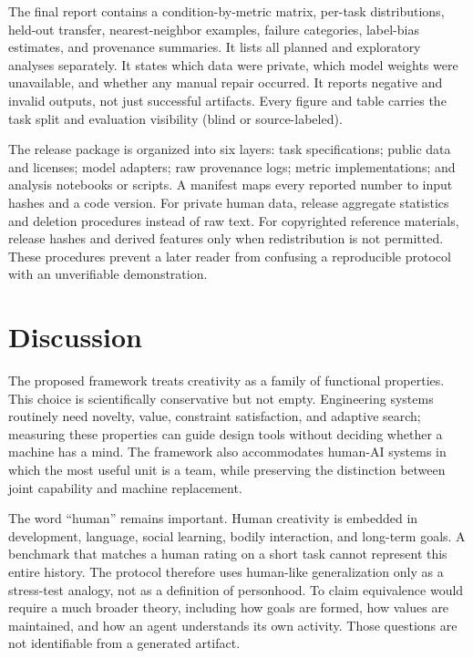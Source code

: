 \documentclass[conference]{IEEEtran}
\begin{document}
The final report contains a condition-by-metric matrix, per-task distributions, held-out
transfer, nearest-neighbor examples, failure categories, label-bias estimates, and
provenance summaries. It lists all planned and exploratory analyses separately. It
states which data were private, which model weights were unavailable, and whether any
manual repair occurred. It reports negative and invalid outputs, not just successful
artifacts. Every figure and table carries the task split and evaluation visibility
(blind or source-labeled).

The release package is organized into six layers: task specifications; public data and
licenses; model adapters; raw provenance logs; metric implementations; and analysis
notebooks or scripts. A manifest maps every reported number to input hashes and a code
version. For private human data, release aggregate statistics and deletion procedures
instead of raw text. For copyrighted reference materials, release hashes and derived
features only when redistribution is not permitted. These procedures prevent a later
reader from confusing a reproducible protocol with an unverifiable demonstration.

\section{Discussion}
\label{sec:discussion}

The proposed framework treats creativity as a family of functional properties. This
choice is scientifically conservative but not empty. Engineering systems routinely
need novelty, value, constraint satisfaction, and adaptive search; measuring these
properties can guide design tools without deciding whether a machine has a mind. The
framework also accommodates human-AI systems in which the most useful unit is a team,
while preserving the distinction between joint capability and machine replacement.

The word ``human'' remains important. Human creativity is embedded in development,
language, social learning, bodily interaction, and long-term goals. A benchmark that
matches a human rating on a short task cannot represent this entire history. The
protocol therefore uses human-like generalization only as a stress-test analogy, not as
a definition of personhood. To claim equivalence would require a much broader theory,
including how goals are formed, how values are maintained, and how an agent understands
its own activity. Those questions are not identifiable from a generated artifact.
\end{document}
